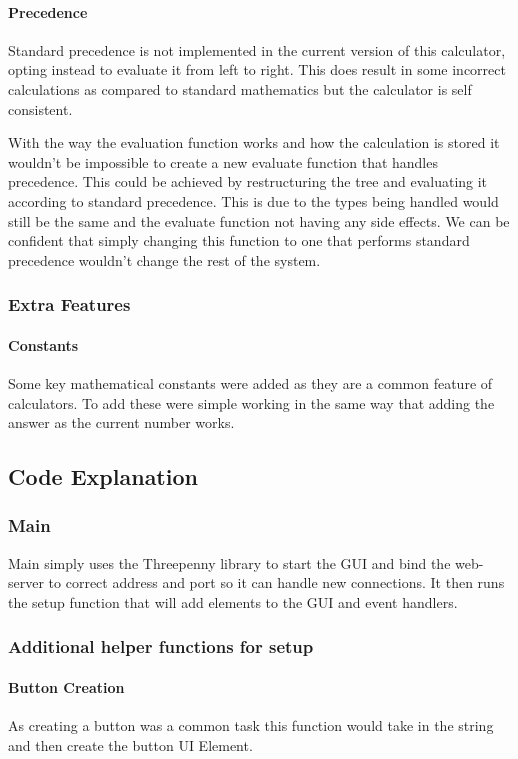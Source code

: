 \documentclass[a4paper]{article}
\begin{document}
\paragraph{Precedence}
Standard precedence is not implemented in the current version of this calculator, opting instead to evaluate it from left to right.
This does result in some incorrect calculations as compared to standard mathematics but the calculator is self consistent.
\par
With the way the evaluation function works and how the calculation is stored it wouldn't be impossible to create a new evaluate function that handles precedence.
This could be achieved by restructuring the tree and evaluating it according to standard precedence.
This is due to the types being handled would still be the same and the evaluate function not having any side effects.
We can be confident that simply changing this function to one that performs standard precedence wouldn't change the rest of the system.

\subsubsection{Extra Features}
\paragraph{Constants}
Some key mathematical constants were added as they are a common feature of calculators.
To add these were simple working in the same way that adding the answer as the current number works.


\subsection{Code Explanation}
\subsubsection{Main}
Main simply uses the Threepenny library to start the GUI and bind the web-server to correct address and port so it can handle new connections.
It then runs the setup function that will add elements to the GUI and event handlers.

\subsubsection{Additional helper functions for setup}
\paragraph{Button Creation}
As creating a button was a common task this function would take in the string and then create the button UI Element.

\end{document}
